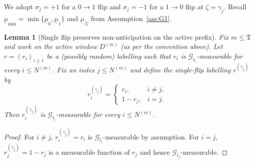 \documentclass{statsoc}
\newtheorem{lemma}[lemma]{Lemma}
\newcommand{\1}{\mathbbm{1}}
\newcommand{\Tmax}{\mathfrak{T}}
\begin{document}
We adopt $\sigma_j=+1$ for a $0\!\to\!1$ flip and $\sigma_j=-1$ for a $1\!\to\!0$ flip at $\zeta=\gamma_j$. Recall $\underline\mu_{\min}=\min\{\underline\mu_0,\underline\mu_1\}$ and $\underline\mu_\Sigma$ from Assumption~\ref{ass:G1}.


\begin{lemma}[Single flip preserves non-anticipation on the active prefix]\label{lem:singleflip-nonant}
Fix $m\le \Tmax$ and work on the active window $D^{(m)}$ (as per the convention above).
Let $r=(r_i)_{i\ge 1}$ be a (possibly random) labelling such that $r_i$ is $\mathcal G_{t_i}$-measurable for every
$i\le N^{(m)}$.
Fix an index $j\le N^{(m)}$ and define the single-flip labelling $r^{(\gamma_j)}$ by
\[
r^{(\gamma_j)}_i=
\begin{cases}
r_i,& i\neq j,\\
1-r_j,& i=j.
\end{cases}
\]
Then $r^{(\gamma_j)}_i$ is $\mathcal G_{t_i}$-measurable for every $i\le N^{(m)}$.
\end{lemma}

\begin{proof}
For $i\neq j$, $r^{(\gamma_j)}_i=r_i$ is $\mathcal G_{t_i}$-measurable by assumption.
For $i=j$, $r^{(\gamma_j)}_j=1-r_j$ is a measurable function of $r_j$ and hence $\mathcal G_{t_j}$-measurable.
\end{proof}
\end{document}
